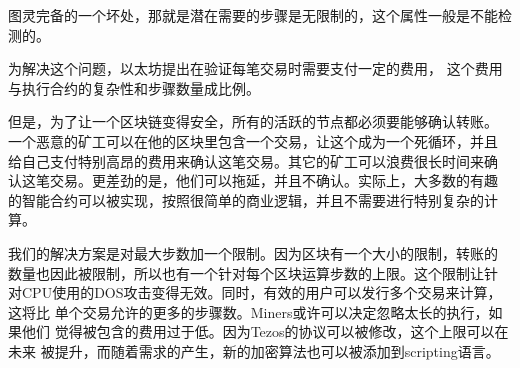 \documentclass[letterpaper]{article}
\begin{document}
图灵完备的一个坏处，那就是潜在需要的步骤是无限制的，这个属性一般是不能检测的。

为解决这个问题，以太坊提出在验证每笔交易时需要支付一定的费用，
这个费用与执行合约的复杂性和步骤数量成比例。

但是，为了让一个区块链变得安全，所有的活跃的节点都必须要能够确认转账。
一个恶意的矿工可以在他的区块里包含一个交易，让这个成为一个死循环，并且
给自己支付特别高昂的费用来确认这笔交易。其它的矿工可以浪费很长时间来确
认这笔交易。更差劲的是，他们可以拖延，并且不确认。实际上，大多数的有趣
的智能合约可以被实现，按照很简单的商业逻辑，并且不需要进行特别复杂的计
算。

我们的解决方案是对最大步数加一个限制。因为区块有一个大小的限制，转账的
数量也因此被限制，所以也有一个针对每个区块运算步数的上限。这个限制让针
对CPU使用的DOS攻击变得无效。同时，有效的用户可以发行多个交易来计算，这将比
单个交易允许的更多的步骤数。Miners或许可以决定忽略太长的执行，如果他们
觉得被包含的费用过于低。因为Tezos的协议可以被修改，这个上限可以在未来
被提升，而随着需求的产生，新的加密算法也可以被添加到scripting语言。
\end{document}
